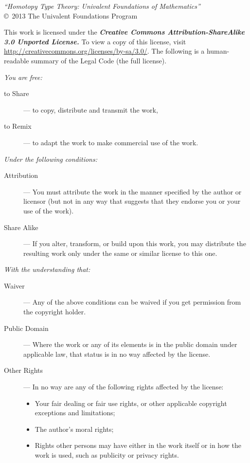 {\small
\noindent
\emph{``Homotopy Type Theory: Univalent Foundations of Mathematics''}\\
\copyright\ 2013 The Univalent Foundations Program

\bigskip
\footnotesize

\noindent
This work is licensed under the
\textbf{\emph{Creative Commons Attribution-ShareAlike 3.0 Unported License.}}
%
To view a copy of this license, visit
\href{http://creativecommons.org/licenses/by-sa/3.0/}{http://creativecommons.org/licenses/by-sa/3.0/}.
The following is a human-readable summary of the Legal Code (the full license).

\bigskip

\noindent
\emph{You are free:}
%
\begin{description}
\item[to Share] --- to copy, distribute and transmit the work,
\item[to Remix] --- to adapt the work to make commercial use of the work.
\end{description}
%
\emph{Under the following conditions:}
%
\begin{description}

\item[Attribution] --- You must attribute the work in the manner specified by the author
  or licensor (but not in any way that suggests that they endorse you or your use of the
  work).

\item[Share Alike] --- If you alter, transform, or build upon this work, you may
  distribute the resulting work only under the same or similar license to this one.
\end{description}
%
\emph{With the understanding that:}
\begin{description}

\item[Waiver] --- Any of the above conditions can be waived if you get permission from the
  copyright holder.

\item[Public Domain] --- Where the work or any of its elements is in the public domain
  under applicable law, that status is in no way affected by the license.

\item[Other Rights] --- In no way are any of the following rights affected by the license:
  \begin{itemize}
  \item Your fair dealing or fair use rights, or other applicable copyright exceptions and
    limitations;
  \item The author's moral rights;
  \item Rights other persons may have either in the work itself or in how the work is
    used, such as publicity or privacy rights.
  \end{itemize}
\end{description}

}
